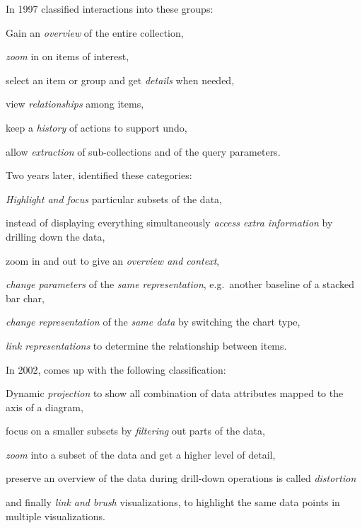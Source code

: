 \documentclass{article}
\begin{document}
In 1997 \textcite{Shneiderman1996} classified interactions into these groups:
\begin{enumerate*}[label=(\arabic*)]
  \item
    Gain an \emph{overview} of the entire collection,
  \item
    \emph{zoom} in on items of interest,
  \item
    select an item or group and get \emph{details} when needed,
  \item
    view \emph{relationships} among items,
  \item
    keep a \emph{history} of actions to support undo,
  \item
    allow \emph{extraction} of sub-collections and of the query parameters.
\end{enumerate*}

Two years later, \textcite{Dix1998} identified these categories:
\begin{enumerate*}[label=(\arabic*)]
  \item
    \emph{Highlight and focus} particular subsets of the data,
  \item
    instead of displaying everything simultaneously \emph{access extra information} by drilling down the data,
  \item
    zoom in and out to give an \emph{overview and context},
  \item
    \emph{change parameters} of the \emph{same representation}, e.g.\ another baseline of a stacked bar char,
  \item
    \emph{change representation} of the \emph{same data} by switching the chart type,
  \item
    \emph{link representations} to determine the relationship between items.
\end{enumerate*}

In 2002, \textcite{Keim2002} comes up with the following classification:
\begin{enumerate*}[label=(\arabic*)]
  \item
    Dynamic \emph{projection} to show all combination of data attributes mapped to the axis of a diagram,
  \item
    focus on a smaller subsets by \emph{filtering} out parts of the data,
  \item
    \emph{zoom} into a subset of the data and get a higher level of detail,
  \item
    preserve an overview of the data during drill-down operations is called \emph{distortion}
  \item
    and finally \emph{link and brush} visualizations, to highlight the same data points in multiple visualizations.
\end{enumerate*}
\end{document}
